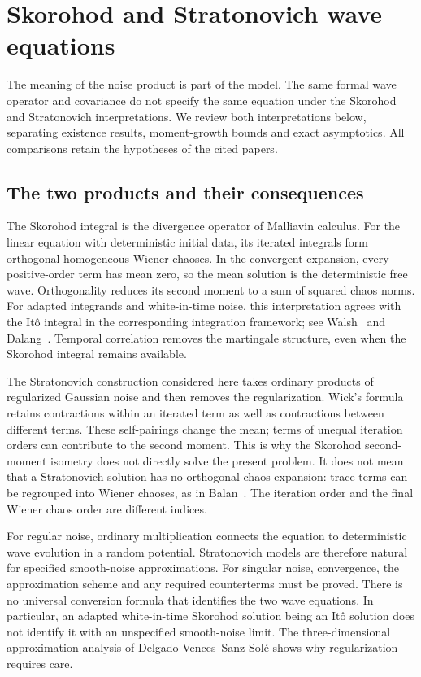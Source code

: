 \section{Skorohod and Stratonovich wave equations}\label{S:literature-context}

The meaning of the noise product is part of the model. The same formal wave
operator and covariance do not specify the same equation under the Skorohod
and Stratonovich interpretations. We review both interpretations below,
separating existence results, moment-growth bounds and exact asymptotics.
All comparisons retain the hypotheses of the cited papers.

\subsection{The two products and their consequences}

The Skorohod integral is the divergence operator of Malliavin calculus. For the
linear equation with deterministic initial data, its iterated integrals form
orthogonal homogeneous Wiener chaoses. In the convergent expansion, every
positive-order term has mean zero, so the mean solution is the deterministic
free wave. Orthogonality reduces its second moment to a sum of squared chaos
norms. For adapted integrands and white-in-time noise, this interpretation
agrees with the It\^o integral in the corresponding integration framework;
see Walsh~\cite{walsh:86:introduction} and Dalang~\cite{dalang:99:extending}.
Temporal correlation removes the martingale structure, even when the
Skorohod integral remains available.

The Stratonovich construction considered here takes ordinary products of
regularized Gaussian noise and then removes the regularization. Wick's
formula retains contractions within an iterated term as well as contractions
between different terms. These self-pairings change the mean; terms of unequal
iteration orders can contribute to the second moment. This is why the
Skorohod second-moment isometry does not directly solve the present problem.
It does not mean that a Stratonovich solution has no orthogonal chaos
expansion: trace terms can be regrouped into Wiener chaoses, as in
Balan~\cite{balan:22:stratonovich}. The iteration order and the final Wiener
chaos order are different indices.

For regular noise, ordinary multiplication connects the equation to
deterministic wave evolution in a random potential. Stratonovich models are
therefore natural for specified smooth-noise approximations. For singular noise, convergence, the approximation scheme and any
required counterterms must be proved. There is no universal conversion formula
that identifies the two wave equations. In particular, an adapted
white-in-time Skorohod solution being an It\^o solution does not identify it
with an unspecified smooth-noise limit. The three-dimensional approximation
analysis of Delgado-Vences--Sanz-Sol\'e
\cite{delgado-vences.sanz-sole:14:approximation} shows why
regularization requires care.

